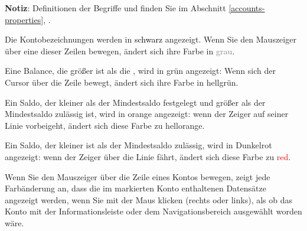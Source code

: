 
\textbf{Notiz}: Definitionen der Begriffe  und  finden Sie im Abschnitt \vref{accounts-properties}, .%


Die Kontobezeichnungen werden in \textcolor{black}{schwarz} angezeigt. Wenn Sie den Mauszeiger über eine dieser Zeilen bewegen, ändert sich ihre Farbe in \textcolor{gray}{grau}.%

Eine Balance, die größer ist als die , wird in \textcolor[RGB]{0,126,0}{grün} angezeigt: Wenn sich der Cursor über die Zeile bewegt, ändert sich ihre Farbe in \textcolor[RGB]{0,227,0}{hellgrün}.%

Ein Saldo, der kleiner als der {Mindestsaldo festgelegt} und größer als der {Mindestsaldo zulässig} ist, wird in \textcolor[RGB]{230,155,0}{orange} angezeigt: wenn der Zeiger auf seiner Linie vorbeigeht, ändert sich diese Farbe zu \textcolor[RGB]{255,200,0}{hellorange}.%

Ein Saldo, der kleiner ist als der {Mindestsaldo zulässig}, wird in \textcolor[RGB]{153,0,0}{Dunkelrot} angezeigt: wenn der Zeiger über die Linie fährt, ändert sich diese Farbe zu \textcolor{red}{red}.%

Wenn Sie den Mauszeiger über die Zeile eines Kontos bewegen, zeigt jede Farbänderung an, dass die im markierten Konto enthaltenen Datensätze angezeigt werden, wenn Sie mit der Maus klicken (rechts oder links), als ob das Konto mit der Informationsleiste oder dem Navigationsbereich ausgewählt worden wäre.%

